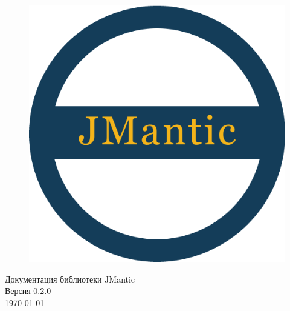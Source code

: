 \begin{titlepage}

\begin{figure}
    \centering
    \includegraphics[scale=0.6]{images/logo.png}
\end{figure}

\begin{center}
    \huge Документация библиотеки JMantic \\[0.5em]
    \large Версия 0.2.0 \\[0.5em]
    
    \vfill
    \today
\end{center}

\end{titlepage}